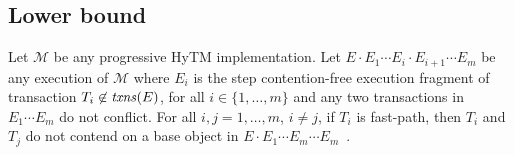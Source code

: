 \subsection{Lower bound}
%
%
\begin{lemma}
\label{lm:hytm}
%
Let $\mathcal{M}$ be any progressive HyTM implementation.
Let $E\cdot E_1 \cdots E_i \cdot E_{i+1} \cdots E_m$ be any execution of $\mathcal{M}$ where
$E_i$ is the step contention-free
execution fragment of transaction $T_i \not\in \ms{txns}(E)$,
for all $i\in \{1,\ldots , m\}$
and any two transactions in $E_1 \cdots E_m$ do not conflict.
For all $i,j=1,\ldots,m$, $i\neq j$, if $T_i$ is fast-path, then $T_i$
and $T_j$ do not contend on a
base object in  $E\cdot E_1 \cdots E_{m} \cdots E_m$~\cite{htmdisc15}.
\end{lemma}

